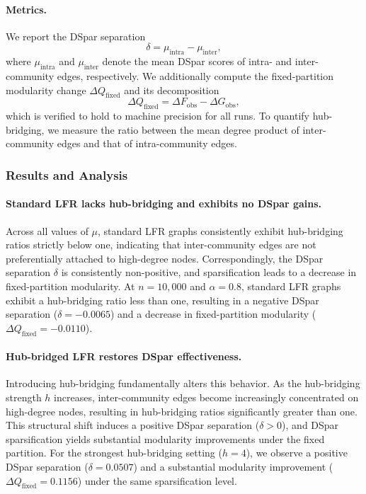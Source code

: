 \documentclass[10pt,journal,compsoc]{IEEEtran}
\begin{document}
\paragraph{Metrics.}
We report the DSpar separation
\[
\delta = \mu_{\mathrm{intra}} - \mu_{\mathrm{inter}},
\]
where $\mu_{\mathrm{intra}}$ and $\mu_{\mathrm{inter}}$ denote the mean DSpar scores of intra- and inter-community edges, respectively.
We additionally compute the fixed-partition modularity change $\Delta Q_{\mathrm{fixed}}$ and its decomposition
\[
\Delta Q_{\mathrm{fixed}} = \Delta F_{\mathrm{obs}} - \Delta G_{\mathrm{obs}},
\]
which is verified to hold to machine precision for all runs.
To quantify hub-bridging, we measure the ratio between the mean degree product of inter-community edges and that of intra-community edges.

\subsubsection{Results and Analysis}

\paragraph{Standard LFR lacks hub-bridging and exhibits no DSpar gains.}
Across all values of $\mu$, standard LFR graphs consistently exhibit hub-bridging ratios strictly below one, indicating that inter-community edges are not preferentially attached to high-degree nodes.
Correspondingly, the DSpar separation $\delta$ is consistently non-positive, and sparsification leads to a decrease in fixed-partition modularity.
At $n=10{,}000$ and $\alpha=0.8$, standard LFR graphs exhibit a hub-bridging ratio less than one,
resulting in a negative DSpar separation ($\delta=-0.0065$) and a decrease in fixed-partition
modularity ($\Delta Q_{\mathrm{fixed}}=-0.0110$).


\paragraph{Hub-bridged LFR restores DSpar effectiveness.}
Introducing hub-bridging fundamentally alters this behavior.
As the hub-bridging strength $h$ increases, inter-community edges become increasingly concentrated on high-degree nodes, resulting in hub-bridging ratios significantly greater than one.
This structural shift induces a positive DSpar separation ($\delta>0$), and DSpar sparsification yields substantial modularity improvements under the fixed partition.
For the strongest hub-bridging setting ($h=4$), we observe a positive DSpar separation
($\delta=0.0507$) and a substantial modularity improvement
($\Delta Q_{\mathrm{fixed}}=0.1156$) under the same sparsification level.
\end{document}
